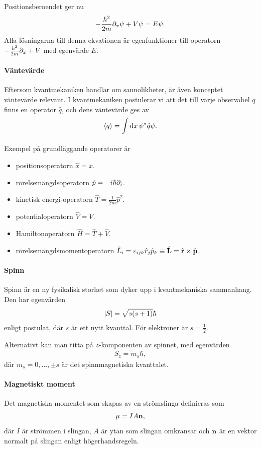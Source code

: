 Positionsberoendet ger nu
\begin{align*}
	-\frac{\hbar^{2}}{2m}\partial_{x}\psi + V\psi = E\psi.
\end{align*}
Alla lösningarna till denna ekvationen är egenfunktioner till operatorn $-\frac{\hbar^{2}}{2m}\partial_{x} + V$ med egenvärde $E$.

\paragraph{Väntevärde}
Eftersom kvantmekaniken handlar om sannolikheter, är även konceptet väntevärde relevant. I kvantmekaniken postulerar vi att det till varje observabel $q$ finns en operator $\hat{q}$, och dens väntevärde ges av
\begin{align*}
	\expval{q} = \int\limits_{}\dd{x}\psi^{*}\hat{q}\psi.
\end{align*}
Exempel på grundläggande operatorer är
\begin{itemize}
	\item positionsoperatorn $\hat{x} = x$.
	\item rörelsemängdsoperatorn $\hat{p} = -i\hbar\partial_{i}$.
	\item kinetisk energi-operatorn $\hat{T} = \frac{1}{2m}\hat{p}^{2}$.
	\item potentialoperatorn $\hat{V} = V$.
	\item Hamiltonoperatorn $\hat{H} = \hat{T} + \hat{V}$.
	\item rörelsemängdsmomentoperatorn $\hat{L}_{i} = \varepsilon_{ijk}\hat{r}_{j}\hat{p}_{k}\equiv \hat{\vb{L}} = \hat{\vb{r}}\times\hat{\vb{p}}$.
\end{itemize}

\paragraph{Spinn}
Spinn är en ny fysikalisk storhet som dyker upp i kvantmekaniska sammanhang. Den har egenvärden
\begin{align*}
	\abs{S} = \sqrt{s(s + 1)}\hbar
\end{align*}
enligt postulat, där $s$ är ett nytt kvanttal. För elektroner är $s = \frac{1}{2}$.

Alternativt kan man titta på $z$-komponenten av spinnet, med egenvärden
\begin{align*}
	S_{z} = m_{s}\hbar,
\end{align*}
där $m_{s} = 0, \dots, \pm s$ är det spinnmagnetiska kvanttalet.

\paragraph{Magnetiskt moment}
Det magnetiska momentet som skapas av en strömslinga definieras som
\begin{align*}
	\vb{\mu} = IA\vb{n},
\end{align*}
där $I$ är strömmen i slingan, $A$ är ytan som slingan omkransar och $\vb{n}$ är en vektor normalt på slingan enligt högerhandsregeln.

